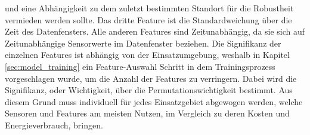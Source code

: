 und eine Abhängigkeit zu dem zuletzt bestimmten Standort für die Robustheit vermieden werden sollte.
Das dritte Feature ist die Standardweichung über die Zeit des Datenfensters.
Alle anderen Features sind Zeitunabhängig, da sie sich auf Zeitunabhängige Sensorwerte im Datenfenster beziehen.
\newline
\newline
Die Signifikanz der einzelnen Features ist abhängig von der Einsatzumgebung, weshalb in Kapitel \ref{sec:model_training}
ein Feature-Auswahl Schritt in dem Trainingsprozess vorgeschlagen wurde, um die Anzahl der Features zu verringern.
Dabei wird die Signifikanz, oder Wichtigkeit, über die Permutationswichtigkeit bestimmt.
Aus diesem Grund muss individuell für jedes Einsatzgebiet abgewogen werden, welche Sensoren und Features am meisten Nutzen,
im Vergleich zu deren Kosten und Energieverbrauch, bringen.
